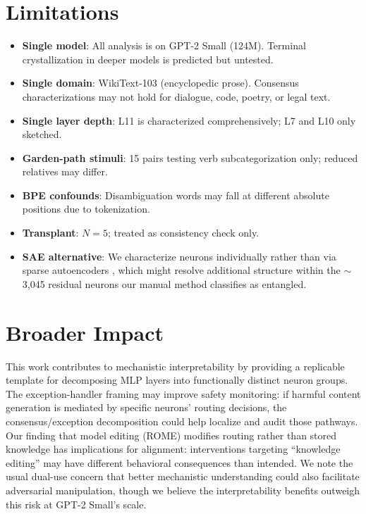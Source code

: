 \documentclass{article}
\begin{document}
\section{Limitations}
\label{app:limitations}

\begin{itemize}
\item \textbf{Single model}: All analysis is on GPT-2 Small (124M). Terminal
crystallization in deeper models is predicted but untested.
\item \textbf{Single domain}: WikiText-103 (encyclopedic prose). Consensus
characterizations may not hold for dialogue, code, poetry, or legal text.
\item \textbf{Single layer depth}: L11 is characterized comprehensively; L7 and
L10 only sketched.
\item \textbf{Garden-path stimuli}: 15 pairs testing verb subcategorization only;
reduced relatives may differ.
\item \textbf{BPE confounds}: Disambiguation words may fall at different absolute
positions due to tokenization.
\item \textbf{Transplant}: $N = 5$; treated as consistency check only.
\item \textbf{SAE alternative}: We characterize neurons individually rather than
via sparse autoencoders \citep{bricken2023monosemanticity, templeton2024scaling},
which might resolve additional structure within the $\sim$3{,}045 residual
neurons our manual method classifies as entangled.
\end{itemize}

\section{Broader Impact}
\label{sec:broader_impact}

This work contributes to mechanistic interpretability by providing a replicable template for decomposing MLP layers into functionally distinct neuron groups. The exception-handler framing may improve safety monitoring: if harmful content generation is mediated by specific neurons' routing decisions, the consensus/exception decomposition could help localize and audit those pathways. Our finding that model editing (ROME) modifies routing rather than stored knowledge has implications for alignment: interventions targeting ``knowledge editing'' may have different behavioral consequences than intended. We note the usual dual-use concern that better mechanistic understanding could also facilitate adversarial manipulation, though we believe the interpretability benefits outweigh this risk at GPT-2 Small's scale.
\end{document}

